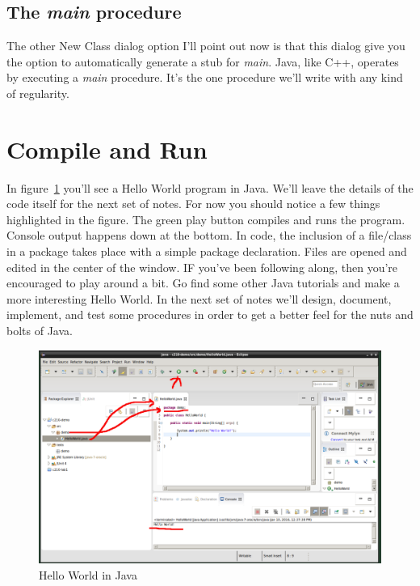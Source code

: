 \documentclass[nobib]{tufte-handout}
\begin{document}
\subsection{The \textit{main} procedure}

The other New Class dialog option I'll point out now is that this dialog give you the option to automatically generate a stub for \textit{main}.  Java, like C++, operates by executing a \textit{main} procedure. It's the one procedure we'll write with any kind of regularity.

\section{Compile and Run}

In figure~\ref{fig:helloworld} you'll see a Hello World program in Java. We'll leave the details of the code itself for the next set of notes. For now you should notice a few things highlighted in the figure. The green play button compiles and runs the program. Console output happens down at the bottom. In code, the inclusion of a file/class in a package takes place with a simple package declaration. Files are opened and edited in the center of the window. IF you've been following along, then you're encouraged to play around a bit. Go find some other Java tutorials and make a more interesting Hello World. In the next set of notes we'll design, document, implement, and test some procedures in order to get a better feel for the nuts and bolts of Java.


\vspace{.1in}
\begin{center}
\begin{figure}[h]
\includegraphics[scale=.25]{Eclipse-HelloWorld.png}
\caption{Hello World in Java}
\label{fig:helloworld}
\end{figure}
\end{center}
\vspace{.1in}
\end{document}
